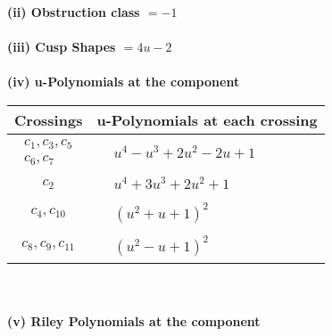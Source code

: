 \documentclass[1p]{elsarticle_modified}
\theoremstyle{definition}
\begin{document}
\flushleft \textbf{(ii) Obstruction class $= -1$}\\~\\
\flushleft \textbf{(iii) Cusp Shapes $= 4 u-2$}\\~\\
\newpage\renewcommand{\arraystretch}{1}
\flushleft \textbf{(iv) u-Polynomials at the component}\newline \\
\begin{tabular}{m{50pt}|m{274pt}}
Crossings & \hspace{64pt}u-Polynomials at each crossing \\
\hline $$\begin{aligned}c_{1},c_{3},c_{5}\\c_{6},c_{7}\end{aligned}$$&$\begin{aligned}
&u^4- u^3+2 u^2-2 u+1
\end{aligned}$\\
\hline $$\begin{aligned}c_{2}\end{aligned}$$&$\begin{aligned}
&u^4+3 u^3+2 u^2+1
\end{aligned}$\\
\hline $$\begin{aligned}c_{4},c_{10}\end{aligned}$$&$\begin{aligned}
&(u^2+u+1)^2
\end{aligned}$\\
\hline $$\begin{aligned}c_{8},c_{9},c_{11}\end{aligned}$$&$\begin{aligned}
&(u^2- u+1)^2
\end{aligned}$\\
\hline
\end{tabular}\\~\\
\newpage\renewcommand{\arraystretch}{1}
\flushleft \textbf{(v) Riley Polynomials at the component}\newline \\
\end{document}
